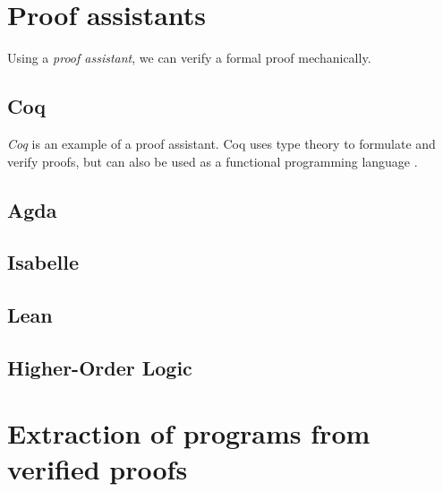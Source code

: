 \section{Proof assistants}

Using a \textit{proof assistant}, we can verify a formal proof mechanically.

\subsection{Coq}
\textit{Coq} is an example of a proof assistant.
Coq uses type theory to formulate and verify proofs, but can also be used as a functional programming language \cite{cintro}.

\subsection{Agda}

\subsection{Isabelle}

\subsection{Lean}

\subsection{Higher-Order Logic}

\section{Extraction of programs from verified proofs}

